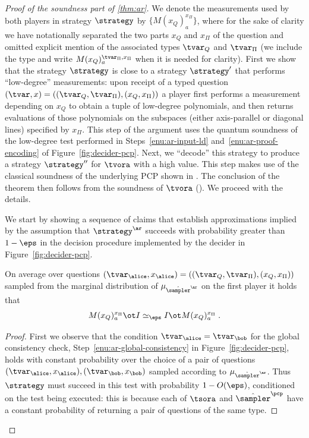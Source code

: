 \begin{proof}[Proof of the soundness part of \cref{thm:ar}]
  We denote the measurements used by both players in strategy $\strategy$ by
  $\{M({x}_Q)^{ {x}_{\Pi}}_{a}\}$, where for the sake of clarity we have
  notationally separated the two parts ${x}_Q$ and $x_\Pi$ of the question and
  omitted explicit mention of the associated types $\tvar_Q$ and $\tvar_\Pi$ (we
  include the type and write $M({x}_Q)^{\tvar_\Pi, {x}_{\Pi}}_{a}$ when it is
  needed for clarity).
  First we show that the strategy $\strategy$ is close to a strategy
  $\strategy'$ that performs ``low-degree'' measurements: upon receipt of a
  typed question $(\tvar,x)=((\tvar_Q,\tvar_\Pi),({x}_Q,x_\Pi))$ a player first
  performs a measurement depending on ${x}_Q$ to obtain a tuple of low-degree
  polynomials, and then returns evaluations of those polynomials on the
  subspaces (either axis-parallel or diagonal lines) specified by $x_\Pi$.
  This step of the argument uses the quantum soundness of the low-degree test
  performed in Steps~\ref{enu:ar-input-ld}
  and~\ref{enu:ar-proof-encoding} of Figure~\ref{fig:decider-pcp}.
  Next, we ``decode'' this strategy to produce a strategy $\strategy''$ for
  $\tvora$ with a high value.
  This step makes use of the classical soundness of the underlying PCP shown in
  .
  The conclusion of the theorem then follows from the soundness of
  $\tvora$ ().
  We proceed with the details.

	We start by showing a sequence of claims that establish approximations implied
  by the assumption that $\strategy^\ar$ succeeds with probability greater than 
  $1-\eps$ in the decision procedure implemented by the decider in
  Figure~\ref{fig:decider-pcp}.


  \begin{claim}
    \label{claim:ar-1}
    On average over questions
    $(\tvar_\alice,x_\alice)=((\tvar_Q,\tvar_\Pi),({x}_Q, x_{\Pi}))$ sampled
    from the marginal distribution of $ \mu_{\tsans}$ on the first player
    it holds that
    \begin{equation}
      \label{eq:global-consistency}
      M({x}_Q)^{x_{\Pi}}_a \ot I \simeq_{\eps} I \ot M({x}_Q)^{x_{\Pi}}_a\;.
    \end{equation}
  \end{claim}

  \begin{proof}
    First we observe that the condition $\tvar_\alice = \tvar_\bob$ for the
    global consistency check, Step~\ref{enu:ar-global-consistency} in
    Figure~\ref{fig:decider-pcp}, holds with constant probability over the
    choice of a pair of questions $(\tvar_\alice,x_\alice),(\tvar_\bob,x_\bob)$
    sampled according to $\mu_{\tsans}$.
    Thus $\strategy$ must succeed in this test with probability $1-O(\eps)$,
    conditioned on the test being executed: this is because each of
    $\tsora$ and $\tspcp$ have a constant probability of returning
    a pair of questions of the same type.


\end{proof}
\end{proof}
